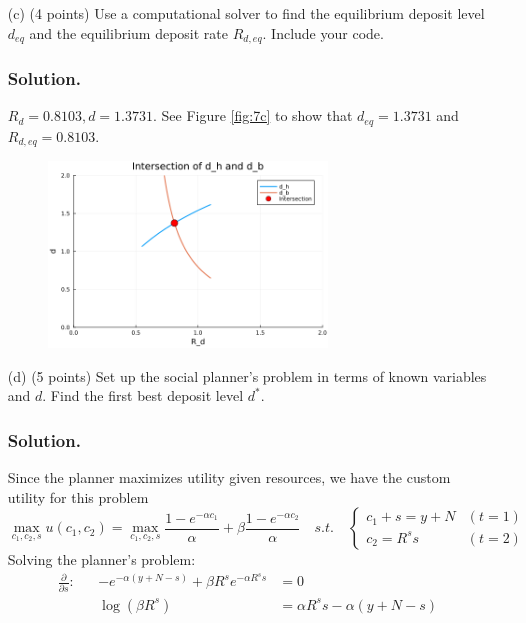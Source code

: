 \documentclass[12pt]{article}
\begin{document}
\begin{enumerate}
\begin{enumerate}
        \item[(c)] {(4 points)} Use a computational solver to find the equilibrium deposit level $d_{eq}$ and the equilibrium deposit rate $R_{d,eq}$. Include your code.
        \subsubsection*{Solution.}

        $  R_d = 0.8103,  d   = 1.3731$. See Figure \eqref{fig:7c} to show that $d_{eq}=1.3731$ and $R_{d,eq}=0.8103.$

        \begin{figure}%
            \centering
                \includegraphics[width=0.7\textwidth]{7c.png}
                \caption{ }
                \label{fig:7c}
        \end{figure}
        
        \item[(d)] {(5 points)} Set up the social planner’s problem in terms of known variables and $d$. Find the first best deposit level $d^*$.
        \subsubsection*{Solution.}

        Since the planner maximizes utility given resources, we have the custom utility for this problem 
        \[ \max_{c_1,c_2,s}   
        u(c_1, c_2) = \max_{c_1,c_2,s}  \frac{1 - e^{-\alpha c_1}}{\alpha} + \beta \frac{1 - e^{-\alpha c_2}}{\alpha} 
        \quad s.t. \quad \begin{cases}
            c_1 + s = y + N & (t=1)
            \\ c_2 = R^ss & (t=2)
        \end{cases} %
        \]
        Solving the planner's problem: 
        \begin{align*}
           \frac{\partial}{\partial s}: &&  -e^{-\alpha (y + N-s) } + \beta R^s e^{-\alpha R^ss} &= 0
           \\ &&\log\left(\beta R^{s}\right)&=\alpha R^{s}s-\alpha(y+N-s)
        \end{align*}
    

\end{enumerate}
\end{enumerate}
\end{document}
